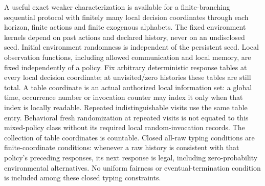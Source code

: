 \documentclass[11pt]{article}
\begin{document}
A useful exact weaker characterization is available for a finite-branching sequential protocol with finitely many local decision coordinates through each horizon, finite actions and finite exogenous alphabets. The fixed environment kernels depend on past actions and declared history, never on an undisclosed seed. Initial environment randomness is independent of the persistent seed. Local observation functions, including allowed communication and local memory, are fixed independently of a policy. Fix arbitrary deterministic response tables at every local decision coordinate; at unvisited/zero histories these tables are still total. A table coordinate is an actual authorized local information set: a global time, occurrence number or invocation counter may index it only when that index is locally readable. Repeated indistinguishable visits use the same table entry. Behavioral fresh randomization at repeated visits is not equated to this mixed-policy class without its required local random-invocation records. The collection of table coordinates is countable. Closed all-raw typing conditions are finite-coordinate conditions: whenever a raw history is consistent with that policy's preceding responses, its next response is legal, including zero-probability environmental alternatives. No uniform fairness or eventual-termination condition is included among these closed typing constraints.
\end{document}
